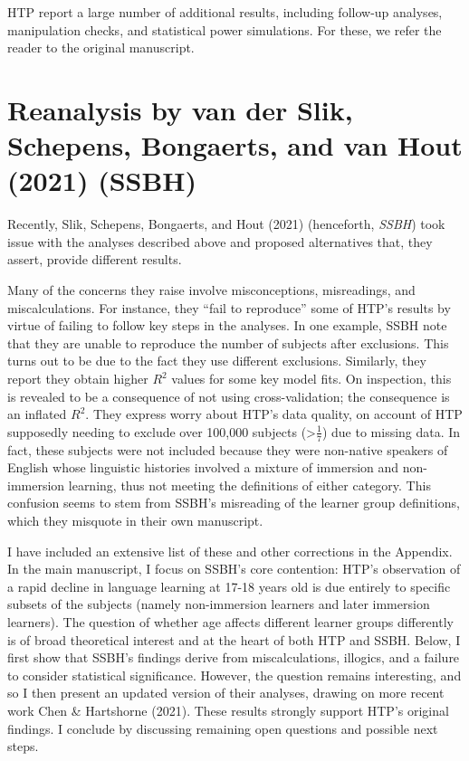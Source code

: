 \documentclass[
  english,
  doc,floatsintext]{apa6}
\begin{document}
HTP report a large number of additional results, including follow-up analyses, manipulation checks, and statistical power simulations. For these, we refer the reader to the original manuscript.

\hypertarget{reanalysis-by-van-der-slik-schepens-bongaerts-and-van-hout-2021-ssbh}{%
\section{Reanalysis by van der Slik, Schepens, Bongaerts, and van Hout (2021) (SSBH)}\label{reanalysis-by-van-der-slik-schepens-bongaerts-and-van-hout-2021-ssbh}}

Recently, Slik, Schepens, Bongaerts, and Hout (2021) (henceforth, \emph{SSBH}) took issue with the analyses described above and proposed alternatives that, they assert, provide different results.

Many of the concerns they raise involve misconceptions, misreadings, and miscalculations. For instance, they ``fail to reproduce'' some of HTP's results by virtue of failing to follow key steps in the analyses. In one example, SSBH note that they are unable to reproduce the number of subjects after exclusions. This turns out to be due to the fact they use different exclusions. Similarly, they report they obtain higher \(R^2\) values for some key model fits. On inspection, this is revealed to be a consequence of not using cross-validation; the consequence is an inflated \(R^2\). They express worry about HTP's data quality, on account of HTP supposedly needing to exclude over 100,000 subjects (\textgreater{}\(\frac{1}{7}\)) due to missing data. In fact, these subjects were not included because they were non-native speakers of English whose linguistic histories involved a mixture of immersion and non-immersion learning, thus not meeting the definitions of either category. This confusion seems to stem from SSBH's misreading of the learner group definitions, which they misquote in their own manuscript.

I have included an extensive list of these and other corrections in the Appendix. In the main manuscript, I focus on SSBH's core contention: HTP's observation of a rapid decline in language learning at 17-18 years old is due entirely to specific subsets of the subjects (namely non-immersion learners and later immersion learners). The question of whether age affects different learner groups differently is of broad theoretical interest and at the heart of both HTP and SSBH. Below, I first show that SSBH's findings derive from miscalculations, illogics, and a failure to consider statistical significance. However, the question remains interesting, and so I then present an updated version of their analyses, drawing on more recent work Chen \& Hartshorne (2021). These results strongly support HTP's original findings. I conclude by discussing remaining open questions and possible next steps.
\end{document}
